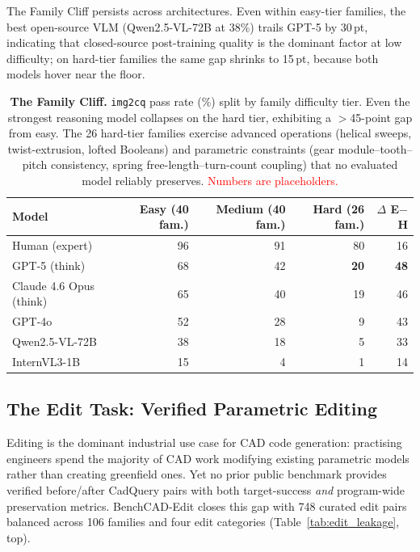 \documentclass{article}
\begin{document}
The Family Cliff persists across architectures. Even within easy-tier families, the best open-source VLM (Qwen2.5-VL-72B at 38\%) trails GPT-5 by 30\,pt, indicating that closed-source post-training quality is the dominant factor at low difficulty; on hard-tier families the same gap shrinks to 15\,pt, because both models hover near the floor.

\begin{table}[t]
\centering
\small
\caption{\textbf{The Family Cliff.} \texttt{img2cq} pass rate (\%) split by family difficulty tier. Even the strongest reasoning model collapses on the hard tier, exhibiting a $>$45-point gap from easy. The 26 hard-tier families exercise advanced operations (helical sweeps, twist-extrusion, lofted Booleans) and parametric constraints (gear module--tooth--pitch consistency, spring free-length--turn-count coupling) that no evaluated model reliably preserves. \textcolor{red}{Numbers are placeholders.}}
\label{tab:family_cliff}
\begin{tabular}{lrrrr}
\toprule
Model & Easy (40 fam.) & Medium (40 fam.) & Hard (26 fam.) & $\Delta$ E$-$H \\
\midrule
Human (expert)         & 96 & 91 & 80 & 16 \\
GPT-5 (think)          & 68 & 42 & \textbf{20} & \textbf{48} \\
Claude 4.6 Opus (think)& 65 & 40 & 19 & 46 \\
GPT-4o                 & 52 & 28 & 9  & 43 \\
Qwen2.5-VL-72B         & 38 & 18 & 5  & 33 \\
InternVL3-1B           & 15 & 4  & 1  & 14 \\
\bottomrule
\end{tabular}
\end{table}


\subsection{The Edit Task: Verified Parametric Editing}
\label{sec:exp_edit}

Editing is the dominant industrial use case for CAD code generation: practising engineers spend the majority of CAD work modifying existing parametric models rather than creating greenfield ones. Yet no prior public benchmark provides verified before/after CadQuery pairs with both target-success \emph{and} program-wide preservation metrics. BenchCAD-Edit closes this gap with 748 curated edit pairs balanced across 106 families and four edit categories (Table~\ref{tab:edit_leakage}, top).
\end{document}
